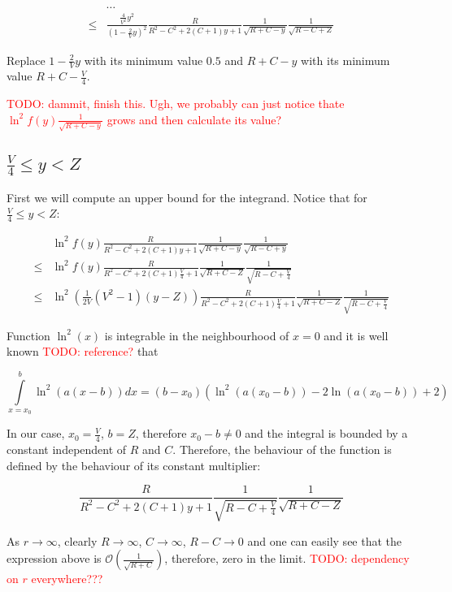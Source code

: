 \documentclass[12pt, a4paper]{article}
\newcommand{\mcO}{\mathcal{O}}
\newcommand{\todo}[1]{{\large \textcolor{red}{TODO: #1}}}
\begin{document}
\begin{align*}
       & \dots 
\\ \le & \frac{\frac{4}{V^2}y^2}{(1 - \frac{2}{V}y)^2}  \frac{R}{R^2 - C^2 + 2 (C + 1) y + 1} \frac{1}{\sqrt{R + C - y}} \frac{1}{\sqrt{R - C + Z}}
\end{align*}

Replace $1 - \frac{2}{V}y$ with its minimum value $0.5$ and $R + C - y$ with its minimum value $R + C - \frac{V}{4}$.

\todo{dammit, finish this. Ugh, we probably can just notice thate $\ln^2 f(y) \frac{1}{\sqrt{R + C - y}}$ grows and then calculate its value?}

\subsection*{$\frac{V}{4} \le y < Z$}

First we will compute an upper bound for the integrand. Notice that for $\frac{V}{4} \le y < Z$:

\begin{align*}
    & \ln^2 f(y) \frac{R}{R^2 - C^2 + 2 (C + 1) y + 1} \frac{1}{\sqrt{R + C - y}} \frac{1}{\sqrt{R - C + y}} 
\\ \le & \ln^2 f(y) \frac{R}{R^2 - C^2 + 2 (C + 1) \frac{V}{4} + 1} \frac{1}{\sqrt{R + C - Z}} \frac{1}{\sqrt{R - C + \frac{V}{4}}}
\\ \le & \ln^2 \left( \frac{1}{2 V}(V^2 - 1) (y - Z) \right) \frac{R}{R^2 - C^2 + 2 (C + 1) \frac{V}{4} + 1} \frac{1}{\sqrt{R + C - Z}} \frac{1}{\sqrt{R - C + \frac{V}{4}}}
\end{align*}

Function $\ln^2(x)$ is integrable in the neighbourhood of $x = 0$ and it is well known \todo{reference?} that

\[
\int\limits_{x=x_0}^b \ln^2(a (x - b)) dx = (b - x_0) (\ln^2(a (x_0 - b)) - 2 \ln(a (x_0 - b)) + 2)
\]

In our case, $x_0 = \frac{V}{4}$, $b = Z$, therefore $x_0 - b \ne 0$ and the integral is bounded by a constant independent of $R$ and $C$. Therefore, the behaviour of the function is defined by the behaviour of its constant multiplier:

\[
\frac{R}{R^2 - C^2 + 2 (C + 1) y + 1} \frac{1}{\sqrt{R - C + \frac{V}{4}}} \frac{1}{\sqrt{R + C - Z}}
\]

As $r \to \infty$, clearly $R \to \infty$, $C \to \infty$, $R - C \to 0$ and one can easily see that the expression above is $\mcO(\frac{1}{\sqrt{R + C}})$, therefore, zero in the limit. \todo{dependency on $r$ everywhere???}
\end{document}
